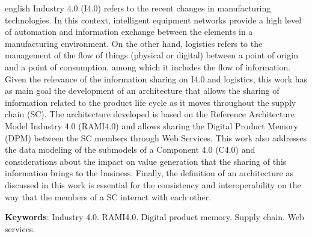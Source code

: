 \begin{resumo}[Abstract]
	\begin{otherlanguage*}{english}
		Industry 4.0 (I4.0) refers to the recent changes in manufacturing technologies. In this context, intelligent equipment networks provide a high level of automation and information exchange between the elements in a manufacturing environment. On the other hand, logistics refers to the management of the flow of things (physical or digital) between a point of origin and a point of consumption, among which it includes the flow of information. Given the relevance of the information sharing on I4.0 and logistics, this work has as main goal the development of an architecture that allows the sharing of information related to the product life cycle as it moves throughout the supply chain (SC). The architecture developed is based on the Reference Architecture Model Industry 4.0 (RAMI4.0) and allows sharing the Digital Product Memory (DPM) between the SC members through Web Services. This work also addresses the data modeling of the submodels of a Component 4.0 (C4.0) and considerations about the impact on value generation that the sharing of this information brings to the business. Finally, the definition of an architecture as discussed in this work is essential for the consistency and interoperability on the way that the members of a SC interact with each other.
		\vspace{\onelineskip}

		\noindent
		\textbf{Keywords}: Industry 4.0. RAMI4.0. Digital product memory. Supply chain. Web services.
	\end{otherlanguage*}
\end{resumo}

\listoffigures*
\cleardoublepage

\listoftables*
\cleardoublepage

